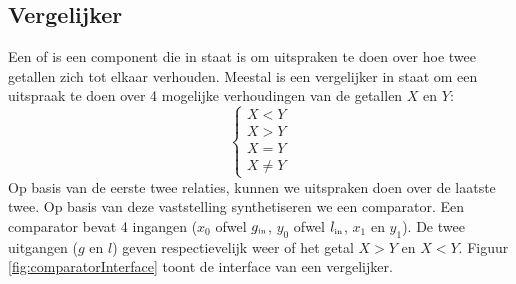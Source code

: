 \subsection{Vergelijker}
Een  of  is een component die in staat is om uitspraken te doen over hoe twee getallen zich tot elkaar verhouden. Meestal is een vergelijker in staat om een uitspraak te doen over 4 mogelijke verhoudingen van de getallen $X$ en $Y$:
\begin{equation}
\left\{\begin{array}{c}
X<Y\\
X>Y\\
X=Y\\
X\neq Y
\end{array}\right.
\end{equation}
Op basis van de eerste twee relaties, kunnen we uitspraken doen over de laatste twee. Op basis van deze vaststelling synthetiseren we een comparator. Een comparator bevat 4 ingangen ($x_0$ ofwel $g_{\mbox{\tiny{in}}}$, $y_0$ ofwel $l_{\mbox{\tiny{in}}}$, $x_1$ en $y_1$). De twee uitgangen ($g$ en $l$) geven respectievelijk weer of het getal $X>Y$ en $X<Y$. Figuur \ref{fig:comparatorInterface} toont de interface van een vergelijker.
